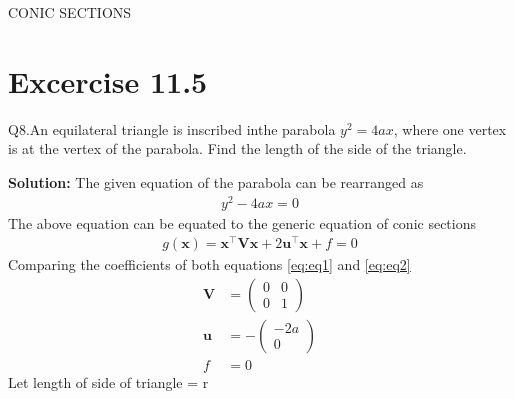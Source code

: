 \documentclass[12pt]{article}
\providecommand{\brak}[1]{\ensuremath{\left(#1\right)}}
\newcommand{\solution}{\noindent \textbf{Solution: }}
\newcommand{\myvec}[1]{\ensuremath{\begin{pmatrix}#1\end{pmatrix}}}
\let\vec\mathbf
\begin{document}
\begin{center}
\textbf\large{CONIC SECTIONS}

\end{center}
\section*{Excercise 11.5}
Q8.An equilateral triangle is inscribed inthe parabola $y^2 = 4ax$, where one vertex is at the vertex of the parabola. Find the length of the side of the triangle.

\solution
The given equation of the parabola can be rearranged as
\begin{align}
	\label{eq:eq1}
	y^2-4ax=0
\end{align}
The above equation can be equated to the generic equation of conic sections
\begin{align}
	\label{eq:eq2}
	g\brak{\vec{x}}=\vec{x}^\top \vec{V}\vec{x}+2\vec{u}^\top \vec{x}+f=0
\end{align}
Comparing the coefficients of both equations \eqref{eq:eq1} and \eqref{eq:eq2}
\begin{align}
	\label{eq:eqV}
	\vec{V} &= \myvec{0&0\\0&1}\\
	\label{eq:eqU}
	\vec{u} &= -\myvec{-2a\\0}\\
	\label{eq:eqF}
	f &= 0
\end{align}
Let length of side of triangle = r
\end{document}
